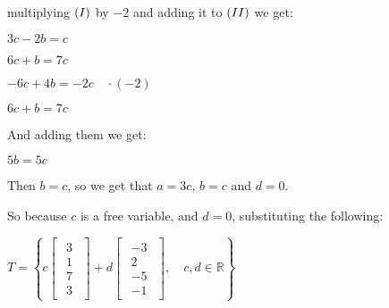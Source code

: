 multiplying $(\rom{1})$ by $-2$ and adding it to $(\rom{2})$ we get:

\singlespacing

$3c-2b=c$

$6c+b=7c$

\singlespacing

$-6c+4b=-2c \quad\cdot(-2)$

$6c+b=7c$

\singlespacing

And adding them we get:

\singlespacing

$5b=5c$

\singlespacing

Then $b=c$, so we get that $a=3c$, $b=c$ and $d=0$.

\singlespacing

So because $c$ is a free variable, and $d=0$, substituting the following:

\singlespacing

\begin{math}
    T=\left\{
    c\begin{bmatrix}
        \begin{array}{c}
            3 \\
            1 \\
            7 \\
            3
        \end{array}
    \end{bmatrix}+
    d\begin{bmatrix}
        \begin{array}{c}
            -3 \\
            2  \\
            -5 \\
            -1
        \end{array}
    \end{bmatrix},\quad c,d \in \mathbb{R}\right\}
\end{math}


\singlespacing

